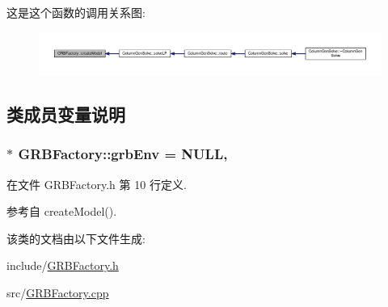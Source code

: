 这是这个函数的调用关系图\+:
\nopagebreak
\begin{figure}[H]
\begin{center}
\leavevmode
\includegraphics[width=350pt]{classGRBFactory_aadd50eacec778be1265b494b4348fe8c_icgraph}
\end{center}
\end{figure}




\subsection{类成员变量说明}
\subsubsection[{\texorpdfstring{grb\+Env}{grbEnv}}]{ $\ast$ G\+R\+B\+Factory\+::grb\+Env = N\+U\+LL\hspace{0.3cm}{\ttfamily [static]}, {\ttfamily [private]}}\hypertarget{classGRBFactory_af4f851ebdd232a3c3054f59078e2c2f5}{}\label{classGRBFactory_af4f851ebdd232a3c3054f59078e2c2f5}


在文件 G\+R\+B\+Factory.\+h 第 10 行定义.



参考自 create\+Model().



该类的文档由以下文件生成\+:\begin{DoxyCompactItemize}
\item 
include/\hyperlink{GRBFactory_8h}{G\+R\+B\+Factory.\+h}\item 
src/\hyperlink{GRBFactory_8cpp}{G\+R\+B\+Factory.\+cpp}\end{DoxyCompactItemize}
